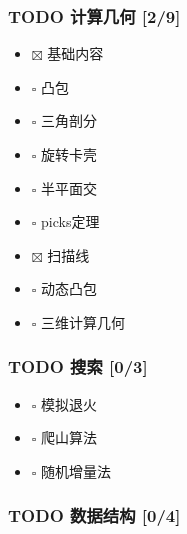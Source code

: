 \documentclass[11pt]{article}
\begin{document}
\subsubsection{{\bfseries\sffamily TODO} 计算几何 [2/9]}
\label{sec-1-1-5}

\begin{itemize}
\item $\boxtimes$ 基础内容
\item $\square$ 凸包
\item $\square$ 三角剖分
\item $\square$ 旋转卡壳
\item $\square$ 半平面交
\item $\square$ picks定理
\item $\boxtimes$ 扫描线
\item $\square$ 动态凸包
\item $\square$ 三维计算几何
\end{itemize}

\subsubsection{{\bfseries\sffamily TODO} 搜索 [0/3]}
\label{sec-1-1-6}

\begin{itemize}
\item $\square$ 模拟退火
\item $\square$ 爬山算法
\item $\square$ 随机增量法
\end{itemize}

\subsubsection{{\bfseries\sffamily TODO} 数据结构 [0/4]}
\label{sec-1-1-7}
\end{document}
